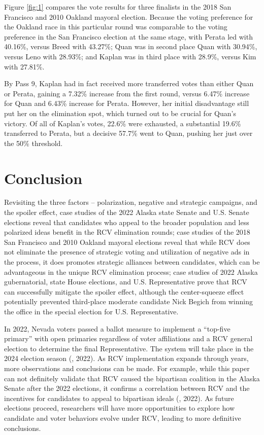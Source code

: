 Figure \ref{fig:1} compares the vote results for three finalists in the 2018 San Francisco and 2010 Oakland mayoral election. Because the voting preference for the Oakland race in this particular round was comparable to the voting preference in the San Francisco election at the same stage, with Perata led with 40.16\%, versus Breed with 43.27\%; Quan was in second place Quan with 30.94\%, versus Leno with 28.93\%; and Kaplan was in third place with 28.9\%, versus Kim with 27.81\%. 

By Pass 9, Kaplan had in fact received more transferred votes than either Quan or Perata, gaining a 7.32\% increase from the first round, versus 6.47\% increase for Quan and 6.43\% increase for Perata. However, her initial disadvantage still put her on the elimination spot, which turned out to be crucial for Quan’s victory. Of all of Kaplan’s votes, 22.6\% were exhausted, a substantial 19.6\% transferred to Perata, but a decisive 57.7\% went to Quan, pushing her just over the 50\% threshold. 

\section{Conclusion}

Revisiting the three factors – polarization, negative and strategic campaigns, and the spoiler effect, case studies of the 2022 Alaska state Senate and U.S. Senate elections reveal that candidates who appeal to the broader population and less polarized ideas benefit in the RCV elimination rounds; case studies of the 2018 San Francisco and 2010 Oakland mayoral elections reveal that while RCV does not eliminate the presence of strategic voting and utilization of negative ads in the process, it does promotes strategic alliances between candidates, which can be advantageous in the unique RCV elimination process; case studies of 2022 Alaska gubernatorial, state House elections, and U.S. Representative prove that RCV can successfully mitigate the spoiler effect, although the center-squeeze effect potentially prevented third-place moderate candidate Nick Begich from winning the office in the special election for U.S. Representative. 

In 2022, Nevada voters passed a ballot measure to implement a “top-five primary” with open primaries regardless of voter affiliations and a RCV general election to determine the final Representative. The system will take place in the 2024 election season (\cite{clyde2022}, 2022). As RCV implementation expands through years, more observations and conclusions can be made. For example, while this paper can not definitely validate that RCV caused the bipartisan coalition in the Alaska Senate after the 2022 elections, it confirms a correlation between RCV and the incentives for candidates to appeal to bipartisan ideals (\cite{rosen2022}, 2022). As future elections proceed, researchers will have more opportunities to explore how candidate and voter behaviors evolve under RCV, leading to more definitive conclusions. 


